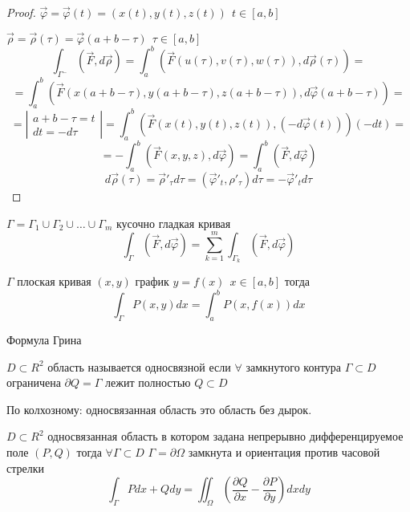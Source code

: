 \begin{proof}
  $\vec \varphi = \vec \varphi(t) = (x(t), y(t), z(t)) ~~ t \in [a,b]$

  $\vec \rho = \vec \rho (\tau) = \vec \varphi(a+b-\tau) ~~ \tau \in [a,b]$
  $$
  \int_{\Gamma^-}(\vec F, d\vec \rho) = \int_a^b (\vec F(u(\tau), v(\tau),
  w(\tau)), d\vec \rho (\tau)) =
  $$
  $$
  = \int_a^b (\vec F(x(a+b-\tau),y(a+b-\tau),z(a+b-\tau)),
  d\vec \varphi(a+b-\tau))
  =
  $$
  $$
  =
  \left|
    \begin{array}{l}
      a+b-\tau = t \\
      dt = -d\tau
    \end{array}
  \right|
  = \int_a^b (\vec F(x(t), y(t), z(t)), (-d\vec \varphi(t)))(-dt) =
  $$
  $$
  = - \int_a^b (\vec F(x,y,z), d \vec \varphi)
  = \int_a^b (\vec F, d \vec \varphi)
  $$
  $$
  d\vec \rho(\tau) = \vec \rho'_{\tau} d\tau = (\vec \varphi'_t, \rho'_{\tau})
  d\tau = -\vec \varphi'_t d\tau
  $$
\end{proof}

\begin{theorem}
  $\Gamma = \Gamma_1 \cup \Gamma_2 \cup \ldots \cup \Gamma_m$ кусочно гладкая
  кривая
  $$
  \int_{\Gamma} (\vec F, d\vec \varphi) = \sum_{k=1}^m \int_{\Gamma_k}
  (\vec F, d\vec \varphi)
  $$
\end{theorem}

\begin{theorem}
  $\Gamma$ плоская кривая $(x,y)$ график $y = f(x) ~~ x \in [a,b]$ тогда
  $$
  \int_{\Gamma} P(x,y)dx = \int_a^b P(x, f(x))dx
  $$
\end{theorem}

\begin{title}[\Large]
  Формула Грина
\end{title}

\begin{define}
  $D \subset R^2$ область называется односвязной если $\forall$ замкнутого
  контура $\Gamma \subset D$ ограничена $\partial Q = \Gamma$
  лежит полностью $Q \subset D$

  По колхозному: односвязанная область это область без дырок.
\end{define}

\begin{block}
  $D \subset R^2$ односвязанная область в котором задана непрерывно
  дифференцируемое поле $(P,Q)$ тогда $\forall \Gamma \subset D$
  $\Gamma = \partial \Omega$ замкнута и
  ориентация против часовой стрелки
  $$
  \int_{\Gamma} Pdx + Qdy = \iint_{\Omega}  \left( \frac{\partial Q}{\partial x}
  - \frac{\partial P}{\partial y} \right) dxdy
  $$
\end{block}

